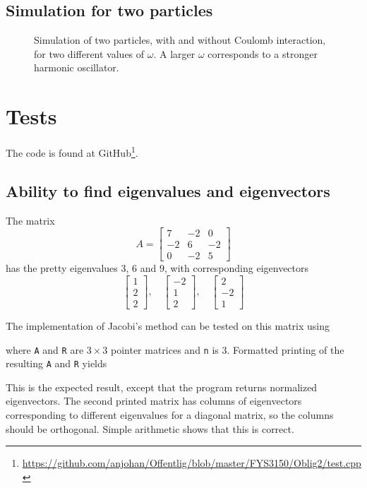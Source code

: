 \documentclass[12pt,english,a4paper]{report}
\begin{document}
\subsection{Simulation for two particles}
\begin{figure}[H]
\centering

\caption{Simulation of two particles, with and without Coulomb interaction, for two different values of \(\omega\). A larger \(\omega\) corresponds to a stronger harmonic oscillator.}
\end{figure}


\section{Tests}
The code is found at GitHub\footnote{\url{https://github.com/anjohan/Offentlig/blob/master/FYS3150/Oblig2/test.cpp}}.
\subsection{Ability to find eigenvalues and eigenvectors}
The matrix
\[
A = \begin{bmatrix}7 & -2 & 0\\ -2 & 6 & -2\\ 0 & -2 & 5\end{bmatrix}
\]
has the pretty eigenvalues \(3\), \(6\) and \(9\), with corresponding eigenvectors
\[
\begin{bmatrix}1 \\ 2 \\ 2\end{bmatrix},\quad
\begin{bmatrix}-2 \\ 1 \\ 2\end{bmatrix}, \quad
\begin{bmatrix}2 \\ -2 \\ 1\end{bmatrix}
\]

The implementation of Jacobi's method can be tested on this matrix using

where \texttt{A} and \texttt{R} are \(3\times3\) pointer matrices and \texttt{n} is \(3\). Formatted printing of the resulting \texttt{A} and \texttt{R} yields

This is the expected result, except that the program returns normalized eigenvectors. The second printed matrix has columns of eigenvectors corresponding to different eigenvalues for a diagonal matrix, so the columns should be orthogonal. Simple arithmetic shows that this is correct.
\end{document}
